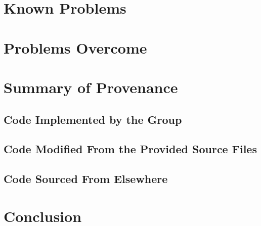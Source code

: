 \documentclass[11]{article}
\begin{document}
		
	\section{Known Problems}

		
	\section{Problems Overcome}

	\section{Summary of Provenance}
			\subsection{Code Implemented by the Group} 

			\subsection{Code Modified From the Provided Source Files}

			\subsection{Code Sourced From Elsewhere}
				
	
\section{Conclusion}
\end{document}
